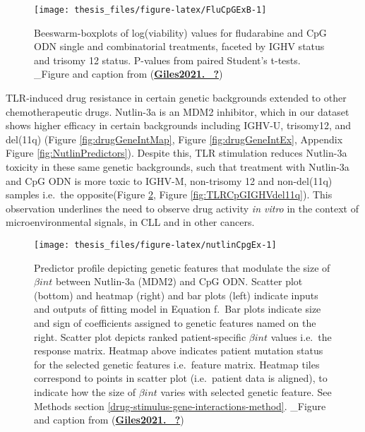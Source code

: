 \documentclass[11pt, a4paper, twosided]{book}
\begin{document}
\begin{figure}

{\centering \texttt{[image: thesis\_files/figure-latex/FluCpGExB-1]} 

}

\caption{Beeswarm-boxplots of log(viability) values for fludarabine and CpG ODN single and combinatorial treatments, faceted by IGHV status and trisomy 12 status. P-values from paired Student's t-tests. \_Figure and caption from (\protect\hyperlink{ref-Giles2021._}{\textbf{Giles2021.\_?}})}\label{fig:FluCpGExB}
\end{figure}
TLR-induced drug resistance in certain genetic backgrounds extended to other chemotherapeutic drugs. Nutlin-3a is an MDM2 inhibitor, which in our dataset shows higher efficacy in certain backgrounds including IGHV-U, trisomy12, and del(11q) (Figure \ref{fig:drugGeneIntMap}, Figure \ref{fig:drugGeneIntEx}, Appendix Figure \ref{fig:NutlinPredictors}). Despite this, TLR stimulation reduces Nutlin-3a toxicity in these same genetic backgrounds, such that treatment with Nutlin-3a and CpG ODN is more toxic to IGHV-M, non-trisomy 12 and non-del(11q) samples i.e.~the opposite(Figure \ref{fig:nutlinCpgEx}, Figure \ref{fig:TLRCpGIGHVdel11q}). This observation underlines the need to observe drug activity \emph{in vitro} in the context of microenvironmental signals, in CLL and in other cancers.


\begin{figure}

{\centering \texttt{[image: thesis\_files/figure-latex/nutlinCpgEx-1]} 

}

\caption{Predictor profile depicting genetic features that modulate the size of \(\beta{int}\) between Nutlin-3a (MDM2) and CpG ODN. Scatter plot (bottom) and heatmap (right) and bar plots (left) indicate inputs and outputs of fitting model in Equation f.~Bar plots indicate size and sign of coefficients assigned to genetic features named on the right. Scatter plot depicts ranked patient-specific \(\beta{int}\) values i.e.~the response matrix. Heatmap above indicates patient mutation status for the selected genetic features i.e.~feature matrix. Heatmap tiles correspond to points in scatter plot (i.e.~patient data is aligned), to indicate how the size of \(\beta{int}\) varies with selected genetic feature. See Methods section \ref{drug-stimulus-gene-interactions-method}. \_Figure and caption from (\protect\hyperlink{ref-Giles2021._}{\textbf{Giles2021.\_?}})}\label{fig:nutlinCpgEx}
\end{figure}
\end{document}
